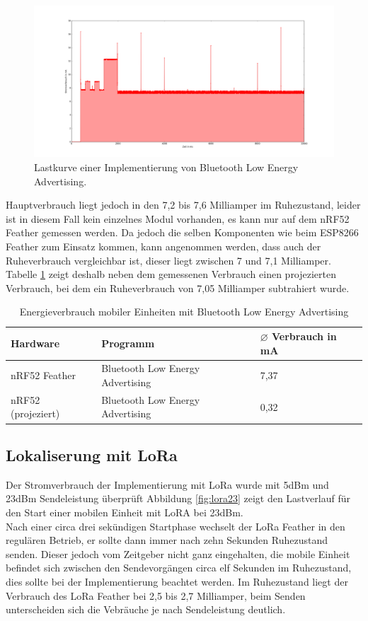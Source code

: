 \begin{figure}[h!]
  \centering
	\includegraphics[width=\textwidth]{plots/blue.png}
  \caption{Lastkurve einer Implementierung von Bluetooth Low Energy Advertising.}
  \label{fig:blue}
\end{figure}

Hauptverbrauch liegt jedoch in den 7,2 bis 7,6 Milliamper im Ruhezustand, leider ist in diesem Fall kein einzelnes Modul vorhanden, es kann nur auf dem nRF52 Feather gemessen werden.
Da jedoch die selben Komponenten wie beim ESP8266 Feather zum Einsatz kommen, kann angenommen werden, dass auch der Ruheverbrauch vergleichbar ist, dieser liegt zwischen 7 und 7,1 Milliamper.
Tabelle \ref{table:blueina} zeigt deshalb neben dem gemessenen Verbrauch einen projezierten Verbrauch, bei dem ein Ruheverbrauch von 7,05 Milliamper subtrahiert wurde.

\begin{table}[h!]
	\centering
	\caption{Energieverbrauch mobiler Einheiten mit Bluetooth Low Energy Advertising}
	\label{table:blueina}
	\begin{tabular}{p{3.5cm}|p{7.5cm}|p{2.5cm}}
		Hardware & Programm & $\varnothing$ Verbrauch in mA \\
		\hline
		nRF52 Feather & Bluetooth Low Energy Advertising & 7,37 \\
		nRF52 (projeziert) & Bluetooth Low Energy Advertising & 0,32 \\
	\end{tabular}
\end{table}

\subsection{Lokaliserung mit LoRa}
Der Stromverbrauch der Implementierung mit LoRa wurde mit 5dBm und 23dBm Sendeleistung überprüft
Abbildung \ref{fig:lora23} zeigt den Lastverlauf für den Start einer mobilen Einheit mit LoRA bei 23dBm.\\
Nach einer circa drei sekündigen Startphase wechselt der LoRa Feather in den regulären Betrieb, er sollte dann immer nach zehn Sekunden Ruhezustand senden.
Dieser jedoch vom Zeitgeber nicht ganz eingehalten, die mobile Einheit befindet sich zwischen den Sendevorgängen circa elf Sekunden im Ruhezustand, dies sollte bei der Implementierung beachtet werden.
Im Ruhezustand liegt der Verbrauch des LoRa Feather bei 2,5 bis 2,7 Milliamper, beim Senden unterscheiden sich die Vebräuche je nach Sendeleistung deutlich.\\


